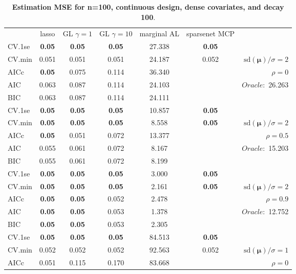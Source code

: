 \clearpage
\begin{table}\vspace{-.5cm}
\caption[l]{ { \bf Estimation MSE for n=100, continuous design, 
dense covariates, and  decay  100}.}
\vspace{-.5cm}
\footnotesize{}
\begin{center}
\begin{tabular}{l*{5}{c}|r}
& lasso & GL $\gamma=1$ & GL $\gamma=10$ & marginal AL & sparsenet MCP  & \\
 \cline{1-7}
CV.1se & {\bf 0.05} & {\bf 0.05} & {\bf 0.05} & 27.338 & {\bf 0.05} & \\
CV.min & 0.051 & 0.051 & 0.051 & 24.187 & 0.052 &  $\mathrm{sd}(\mathbf{\mu})/\sigma=2$ \\
AICc & {\bf 0.05} & 0.075 & 0.114 & 36.340 & & $\rho=0$ \\
AIC & 0.063 & 0.087 & 0.114 & 24.103 & &  \multirow{2}{*}{$Oracle: $ 26.263} \\
BIC & 0.063 & 0.087 & 0.114 & 24.111 & &  \\
 \hline 
CV.1se & {\bf 0.05} & {\bf 0.05} & {\bf 0.05} & 10.857 & {\bf 0.05} & \\
CV.min & {\bf 0.05} & {\bf 0.05} & {\bf 0.05} & 8.558 & {\bf 0.05} &  $\mathrm{sd}(\mathbf{\mu})/\sigma=2$ \\
AICc & {\bf 0.05} & 0.051 & 0.072 & 13.377 & & $\rho=0.5$ \\
AIC & 0.055 & 0.061 & 0.072 & 8.167 & &  \multirow{2}{*}{$Oracle: $ 15.203} \\
BIC & 0.055 & 0.061 & 0.072 & 8.199 & &  \\
 \hline 
CV.1se & {\bf 0.05} & {\bf 0.05} & {\bf 0.05} & 3.000 & {\bf 0.05} & \\
CV.min & {\bf 0.05} & {\bf 0.05} & {\bf 0.05} & 2.161 & {\bf 0.05} &  $\mathrm{sd}(\mathbf{\mu})/\sigma=2$ \\
AICc & {\bf 0.05} & {\bf 0.05} & 0.052 & 2.478 & & $\rho=0.9$ \\
AIC & {\bf 0.05} & {\bf 0.05} & 0.053 & 1.378 & &  \multirow{2}{*}{$Oracle: $ 12.752} \\
BIC & {\bf 0.05} & {\bf 0.05} & 0.053 & 2.305 & &  \\
 \hline 
CV.1se & {\bf 0.05} & {\bf 0.05} & {\bf 0.05} & 84.513 & {\bf 0.05} & \\
CV.min & 0.052 & 0.052 & 0.052 & 92.563 & 0.052 &  $\mathrm{sd}(\mathbf{\mu})/\sigma=1$ \\
AICc & 0.051 & 0.115 & 0.170 & 83.668 & & $\rho=0$ \\

\end{tabular}
\end{center}
\end{table}
